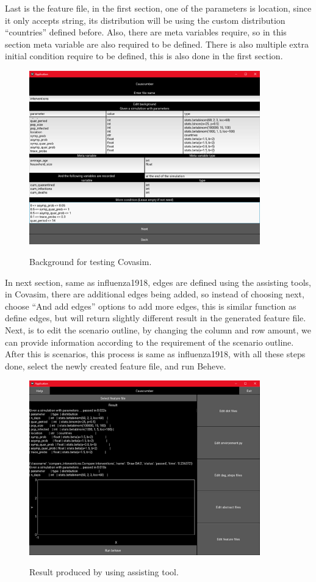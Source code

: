 Last is the feature file, in the first section, one of the parameters is location, since it only accepts string, its distribution will be using the custom distribution “countries” defined before. Also, there are meta variables require, so in this section meta variable are also required to be defined. There is also multiple extra initial condition require to be defined, this is also done in the first section.
\begin{figure}[H]
	\centering
	\includegraphics[width=10cm]{figures/CovasimTestProcess3.png}\\
	\caption{Background for testing Covasim.}
	\label{fig:figure36}
\end{figure}
In next section, same as influenza1918, edges are defined using the assisting tools, in Covasim, there are additional edges being added, so instead of choosing next, choose “And add edges” options to add more edges, this is similar function as define edges, but will return slightly different result in the generated feature file. Next, is to edit the scenario outline, by changing the column and row amount, we can provide information according to the requirement of the scenario outline. After this is scenarios, this process is same as influenza1918, with all these steps done, select the newly created feature file, and run Beheve.
\begin{figure}[H]
	\centering
	\includegraphics[width=10cm]{figures/CovasimTestProcess6.png}\\
	\caption{Result produced by using assisting tool.}
	\label{fig:figure39}
\end{figure}
